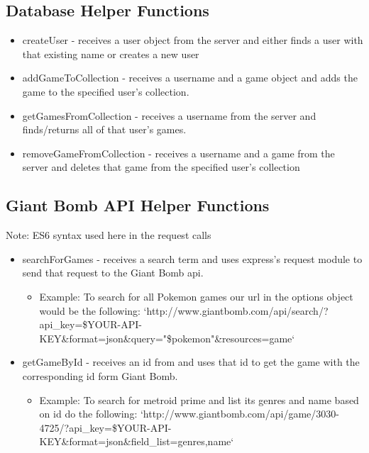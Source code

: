 \documentclass{article}
\begin{document}
\subsection{Database Helper Functions}
\begin{itemize}
  \item createUser - receives a user object from the server and either finds a user with that existing name or creates a new user
  \item addGameToCollection - receives a username and a game object and adds the game to the specified user’s collection.
  \item getGamesFromCollection - receives a username from the server and finds/returns all of that user’s games.
  \item removeGameFromCollection - receives a username and a game from the server and deletes that game from the specified user’s collection
\end{itemize}

\subsection{Giant Bomb API Helper Functions}
Note: ES6 syntax used here in the request calls
\begin{itemize}
  \item searchForGames - receives a search term and uses express’s request module to send that request to the Giant Bomb api.
  \begin{itemize}
    \item \sloppy Example: To search for all Pokemon games our url in the options object would be the following:
   `http://www.giantbomb.com/api/search/?api\_key=\${YOUR-API-KEY}\&format=json\&query="\${pokemon}"\&resources=game`
 \end{itemize}
  \item getGameById - receives an id from and uses that id to get the game with the corresponding id form Giant Bomb.
  \begin{itemize}
    \item \sloppy Example: To search for metroid prime and list its genres and name based on id do the following:
   `http://www.giantbomb.com/api/game/3030-4725/?api\_key=\${YOUR-API-KEY}\&format=json\&field\_list=genres,name`
 \end{itemize}
\end{itemize}
\end{document}
